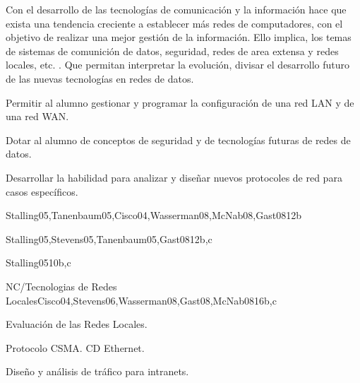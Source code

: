 \begin{syllabus}


\begin{justification}
Con el desarrollo de las tecnologías de comunicación   y la información
 hace que exista una tendencia creciente a  establecer  más redes de
 computadores,  con el objetivo de realizar una mejor gestión de la
 información.  Ello implica, los temas de sistemas de comunición de  datos,
  seguridad, redes de area extensa  y redes  locales, etc.  . Que permitan
  interpretar la  evolución, divisar  el desarrollo  futuro de las
  nuevas  tecnologías en redes de datos.
\end{justification}

\begin{goals}
\item Permitir al alumno gestionar y programar la configuración de una red LAN y de una red WAN.
\item Dotar al alumno de conceptos de seguridad y de tecnologías futuras de redes de datos.
\item Desarrollar la habilidad para analizar y diseñar nuevos protocoles de red para casos específicos.
\end{goals}

\begin{outcomes}
\end{outcomes}

\begin{unit}{\NCIntroductionDef}{}{Stalling05,Tanenbaum05,Cisco04,Wasserman08,McNab08,Gast08}{12}{b}
   \NCIntroductionAllTopics
   \NCIntroductionAllObjectives
\end{unit}

\begin{unit}{\NCNetworkCommunicationDef}{}{Stalling05,Stevens05,Tanenbaum05,Gast08}{12}{b,c}
   \NCNetworkCommunicationAllTopics
   \NCNetworkCommunicationAllObjectives
\end{unit}

\begin{unit}{\NCCompressionDef}{}{Stalling05}{10}{b,c}
	\NCCompressionAllTopics
	\NCCompressionAllObjectives
\end{unit}

\begin{unit}{NC/Tecnologias de Redes Locales}{}{Cisco04,Stevens06,Wasserman08,Gast08,McNab08}{16}{b,c}
   \begin{topics}
      \item Evaluación de las  Redes  Locales.
      \item Protocolo CSMA. CD Ethernet.
      \item Diseño y  análisis de  tráfico para intranets.
   \end{topics}


\end{unit}
\end{syllabus}
